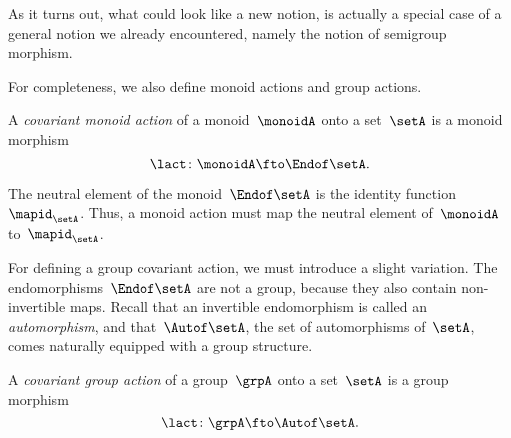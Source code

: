 As it turns out, what could look like a new notion, is actually a special case of a general notion we already encountered, namely the notion of semigroup morphism.

For completeness, we also define monoid actions and group actions.

\begin{ctdefinition}
    \label{def:monoid-cov-action}
    A \emph{covariant monoid  action} of a monoid~$\monoidA$ onto a set~$\setA$ is a monoid morphism
    \begin{equation}
        \label{eq:act-monoid}
        \lact \colon \monoidA \fto \Endof\setA.
    \end{equation}
\end{ctdefinition}

The neutral element of the monoid~$\Endof\setA$ is the identity function~$\mapid_{\setA}$.
Thus, a monoid action must map the neutral element of~$\monoidA$ to~$\mapid_{\setA}$.
%

For defining a group covariant action, we must introduce a slight variation.
The endomorphisms~$\Endof\setA$ are not a group, because they also contain non-invertible maps.
Recall that an invertible endomorphism is called an \emph{automorphism}, and that~$\Autof\setA$, the set of automorphisms of~$\setA$, comes naturally equipped with a group structure.


\begin{ctdefinition}
    \label{def:group-cov-action}
    A \emph{covariant group action} of a group~$\grpA$ onto a set~$\setA$ is a group morphism
    \begin{equation}
        \label{eq:act-group}
        \lact \colon \grpA \fto \Autof\setA.
    \end{equation}
\end{ctdefinition}

